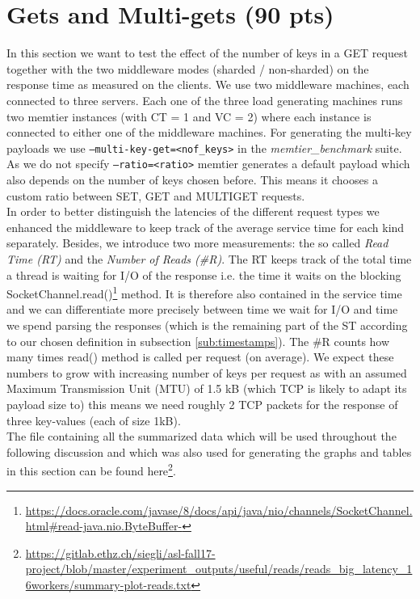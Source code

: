 \documentclass[11pt,a4paper]{article}
\let\ti\textit
\let\tt\texttt
\begin{document}
\section{Gets and Multi-gets (90 pts)}
In this section we want to test the effect of the number of keys in a GET request together with the two middleware modes (sharded / non-sharded) on the response time as measured on the clients. We use two middleware machines, each connected to three servers. Each one of the three load generating machines runs two memtier instances (with CT = 1 and VC = 2) where each instance is connected to either one of the middleware machines. For generating the multi-key payloads we use \tt{--multi-key-get=<nof\_keys>} in the \ti{memtier\_benchmark} suite. As we do not specify \tt{--ratio=<ratio>} memtier generates a default payload which also depends on the number of keys chosen before. This means it chooses a custom ratio between SET, GET and MULTIGET requests. \\
In order to better distinguish the latencies of the different request types we enhanced the middleware to keep track of the average service time for each kind separately. Besides, we introduce two more measurements: the so called \ti{Read Time (RT)} and the \ti{Number of Reads (\#R)}. The RT keeps track of the total time a thread is waiting for I/O of the response i.e. the time it waits on the blocking SocketChannel.read()\footnote{\url{https://docs.oracle.com/javase/8/docs/api/java/nio/channels/SocketChannel.html\#read-java.nio.ByteBuffer-}} method. It is therefore also contained in the service time and we can differentiate more precisely between time we wait for I/O and time we spend parsing the responses (which is the remaining part of the ST according to our chosen definition in subsection \ref{sub:timestamps}). The \#R counts how many times read() method is called per request (on average). We expect these numbers to grow with increasing number of keys per request as with an assumed Maximum Transmission Unit (MTU) of 1.5 kB (which TCP is likely to adapt its payload size to) this means we need roughly 2 TCP packets for the response of three key-values (each of size 1kB).\\
The file containing all the summarized data which will be used throughout the following discussion and which was also used for generating the graphs and tables in this section can be found here\footnote{\url{https://gitlab.ethz.ch/siegli/asl-fall17-project/blob/master/experiment_outputs/useful/reads/reads_big_latency_16workers/summary-plot-reads.txt}}. 
\end{document}
